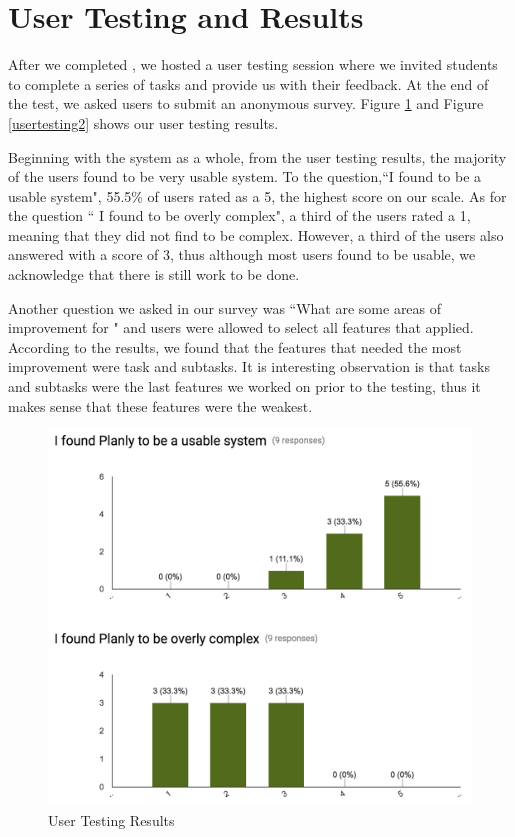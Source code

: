 \section{User Testing and Results}
After we completed \projectTitle{}, we hosted a user testing session where we invited students to complete a series of tasks and provide us with their feedback. At the end of the test, we asked users to submit an anonymous survey. Figure \ref{usertesting1} and Figure \ref{usertesting2} shows our user testing results. 
\par Beginning with the system as a whole, from the user testing results, the majority of the users found \projectTitle{} to be very usable system. To the question,``I found \projectTitle{} to be a usable system", 55.5\% of users rated \projectTitle{} as a 5, the highest score on our scale. As for the question `` I found \projectTitle{} to be overly complex", a third of the users rated \projectTitle{} a 1, meaning that they did not find \projectTitle{} to be complex. However, a third of the users also answered with a score of 3, thus although most users found \projectTitle{} to be usable, we acknowledge that there is still work to be done. 
\par Another question we asked in our survey was ``What are some areas of improvement for \projectTitle{}" and users were allowed to select all features that applied. According to the results, we found that the features that needed the most improvement were task and subtasks. It is interesting observation is that tasks and subtasks were the last features we worked on prior to the testing, thus it makes sense that these features were the weakest.  

\begin{figure}[ht]
\centering
\includegraphics[width=\textwidth]{usertesting1.png}
\caption{User Testing Results}
\label{usertesting1}
\end{figure}

